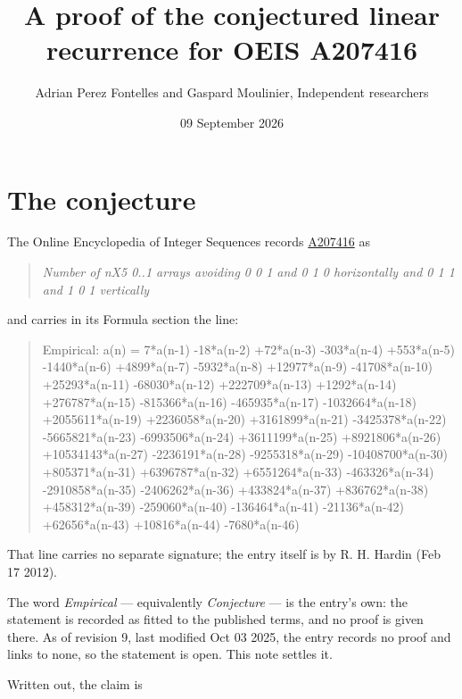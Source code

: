 \documentclass[11pt]{article}
\title{A proof of the conjectured linear recurrence for OEIS A207416}
\author{Adrian Perez Fontelles and Gaspard Moulinier, Independent researchers}
\date{09 September 2026}
\theoremstyle{definition}
\begin{document}
\maketitle
\section{The conjecture}

The Online Encyclopedia of Integer Sequences records \href{https://oeis.org/A207416}{A207416} as

\begin{quote}\itshape Number of nX5 0..1 arrays avoiding 0 0 1 and 0 1 0 horizontally and 0 1 1 and 1 0 1 vertically\end{quote}

and carries in its Formula section the line:

\begin{quote}\ttfamily Empirical: a(n) = 7*a(n-1) -18*a(n-2) +72*a(n-3) -303*a(n-4) +553*a(n-5) -1440*a(n-6) +4899*a(n-7) -5932*a(n-8) +12977*a(n-9) -41708*a(n-10) +25293*a(n-11) -68030*a(n-12) +222709*a(n-13) +1292*a(n-14) +276787*a(n-15) -815366*a(n-16) -465935*a(n-17) -1032664*a(n-18) +2055611*a(n-19) +2236058*a(n-20) +3161899*a(n-21) -3425378*a(n-22) -5665821*a(n-23) -6993506*a(n-24) +3611199*a(n-25) +8921806*a(n-26) +10534143*a(n-27) -2236191*a(n-28) -9255318*a(n-29) -10408700*a(n-30) +805371*a(n-31) +6396787*a(n-32) +6551264*a(n-33) -463326*a(n-34) -2910858*a(n-35) -2406262*a(n-36) +433824*a(n-37) +836762*a(n-38) +458312*a(n-39) -259060*a(n-40) -136464*a(n-41) -21136*a(n-42) +62656*a(n-43) +10816*a(n-44) -7680*a(n-46)\end{quote}

That line carries no separate signature; the entry itself is by R. H. Hardin (Feb 17 2012).

The word {\itshape Empirical} --- equivalently {\itshape Conjecture} --- is the entry's own: the statement is recorded as fitted to the published terms, and no proof is given there. As of revision 9, last modified Oct 03 2025, the entry records no proof and links to none, so the statement is open. This note settles it.

Written out, the claim is
\end{document}
